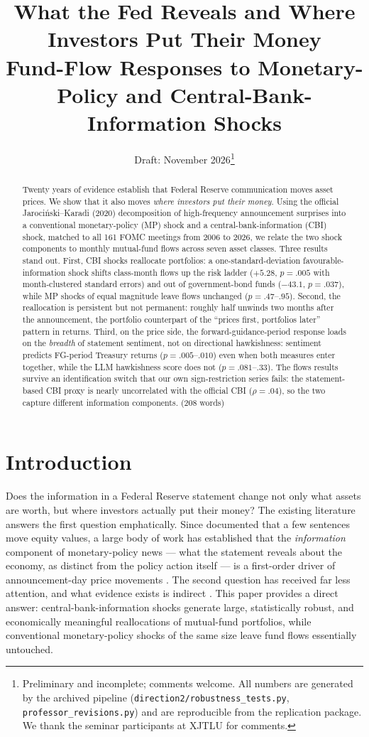 \documentclass[11pt]{article}
\title{\textbf{What the Fed Reveals and Where Investors Put Their Money}\\[10pt]
\large Fund-Flow Responses to Monetary-Policy and Central-Bank-Information Shocks}
\author{Draft: November 2026\thanks{%
Preliminary and incomplete; comments welcome. All numbers are generated by the
archived pipeline (\texttt{direction2/robustness\_tests.py},
\texttt{professor\_revisions.py}) and are reproducible from the replication
package. We thank the seminar participants at XJTLU for comments.}}
\date{}
\newcommand{\jk}{Jaroci\'{n}ski--Karadi}
\begin{document}
\maketitle

\begin{abstract}
\noindent
Twenty years of evidence establish that Federal Reserve communication moves asset
prices. We show that it also moves \emph{where investors put their money}. Using
the official \jk{} (2020) decomposition of high-frequency announcement surprises
into a conventional monetary-policy (MP) shock and a central-bank-information
(CBI) shock, matched to all 161 FOMC meetings from 2006 to 2026, we relate the
two shock components to monthly mutual-fund flows across seven asset classes.
Three results stand out. First, CBI shocks reallocate portfolios: a one-standard-deviation
favourable-information shock shifts class-month flows up the risk ladder
($+5.28$, $p=.005$ with month-clustered standard errors) and out of government-bond
funds ($-43.1$, $p=.037$), while MP shocks of equal magnitude leave flows
unchanged ($p=.47$--$.95$). Second, the reallocation is persistent but not
permanent: roughly half unwinds two months after the announcement, the
portfolio counterpart of the ``prices first, portfolios later'' pattern in
returns. Third, on the price side, the forward-guidance-period response loads
on the \emph{breadth} of statement sentiment, not on directional hawkishness:
sentiment predicts FG-period Treasury returns ($p=.005$--$.010$) even when both
measures enter together, while the LLM hawkishness score does not ($p=.081$--$.33$).
The flows results survive an identification switch that our own
sign-restriction series fails: the statement-based CBI proxy is nearly
uncorrelated with the official CBI ($\rho=.04$), so the two capture different
information components. (208 words)
\end{abstract}

\newpage

\section{Introduction}\label{sec:intro}

Does the information in a Federal Reserve statement change not only what assets
are worth, but where investors actually put their money? The existing literature
answers the first question emphatically. Since \cite{BERNANKE_KUTTNER_2005}
documented that a few sentences move equity values, a large body of work has
established that the \emph{information} component of monetary-policy news ---
what the statement reveals about the economy, as distinct from the policy action
itself --- is a first-order driver of announcement-day price movements
\citep{JAROCINSKI_KARADI_2020, BAUER_SWANSON_2023}. The second question has
received far less attention, and what evidence exists is indirect
\citep{BANEGAS_2022}. This paper provides a direct
answer: central-bank-information shocks generate large, statistically robust,
and economically meaningful reallocations of mutual-fund portfolios, while
conventional monetary-policy shocks of the same size leave fund flows
essentially untouched.
\end{document}
